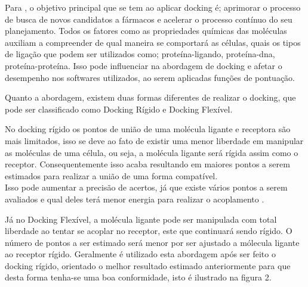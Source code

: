 \documentclass[tcc, capa]{texucpel}
\begin{document}
Para \cite{rodrigues2012estrategias}, o objetivo principal que se tem ao aplicar docking é; aprimorar o processo de busca de novos candidatos a fármacos e acelerar o processo contínuo do seu planejamento. 
% 
% 
% 
% 
Todos os fatores como as propriedades químicas das moléculas auxiliam a compreender de qual maneira se comportará as células, quais os tipos de ligação que podem ser utilizados como; proteína-ligando, proteína-dna, proteína-proteína. Isso pode influenciar na abordagem de docking e afetar o desempenho nos softwares utilizados, ao serem aplicadas funções de pontuação.

Quanto a abordagem, existem duas formas diferentes de realizar o docking, que pode ser classificado como Docking Rígido e Docking Flexível.

No docking rígido os pontos de união de uma molécula ligante e receptora são mais limitados, isso se deve ao fato de existir uma menor liberdade em manipular as moléculas de uma célula, ou seja, a molécula ligante será rígida assim como o receptor. Consequentemente isso acaba resultando em maiores pontos a serem estimados para realizar a união de uma forma compatível. \\
Isso pode aumentar a precisão de acertos, já que existe vários pontos a serem avaliados e qual deles terá menor energia para realizar o acoplamento \cite{pagadala2017software}. 
% 
% 

Já no Docking Flexível, a molécula ligante pode ser manipulada com total liberdade ao tentar se acoplar no receptor,  este que continuará sendo rígido. O número de pontos a ser estimado será menor por ser ajustado a mólecula ligante ao receptor rígido.
Geralmente é utilizado esta abordagem após ser feito o docking rígido, orientado o melhor resultado estimado anteriormente para que desta forma tenha-se uma boa conformidade, isto é ilustrado na figura 2.
\end{document}
